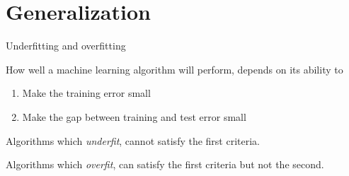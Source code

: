 \documentclass[dvipsnames]{beamer}
\begin{document}
	\section{Generalization}
	\begin{frame}{Underfitting and overfitting}

How well a machine learning algorithm will perform, depends on its ability to %
\begin{enumerate}
\item Make the training error small %
\item Make the gap between training and test error small %
\end{enumerate}

Algorithms which \emph{underfit}, cannot satisfy the first criteria. %

Algorithms which \emph{overfit}, can satisfy the first criteria but not the second.
\end{frame}
\end{document}
